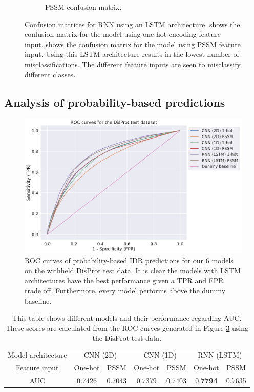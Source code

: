 \documentclass{l4proj}
\begin{document}
\begin{figure}[!htb]
\begin{subfigure}[b]{0.48\textwidth}
        \caption{PSSM confusion matrix.}
        \label{fig:cfrnnpssm}
    \end{subfigure}
    \caption{Confusion matrices for RNN using an LSTM architecture.  shows the confusion matrix for the model using one-hot encoding feature input.  shows the confusion matrix for the model using PSSM feature input. Using this LSTM architecture results in the lowest number of misclassifications. The different feature inputs are seen to misclassify different classes.}
    \label{fig:cfrnn}
\end{figure}

\subsection{Analysis of probability-based predictions}
\label{chap:evaluation sec:testROC}

\begin{figure}[!htb]
    \centering
    \includegraphics[width=0.95\linewidth]{images/DisProtROC.pdf}    

    \caption{ROC curves of probability-based IDR predictions for our 6 models on the withheld DisProt test data. It is clear the models with LSTM architectures have the best performance given a TPR and FPR trade off. Furthermore, every model performs above the dummy baseline.}

    \label{fig:roctest} 
\end{figure}

\begin{table}[!htb]
    \centering
    \caption{This table shows different models and their performance regarding AUC. These scores are calculated from the ROC curves generated in Figure \ref{fig:roctest} using the DisProt test data.}
    \begin{tabular}{@{}ccccccc@{}}
    \toprule
    Model architecture & \multicolumn{2}{c}{CNN (2D)} & \multicolumn{2}{c}{CNN (1D)} & \multicolumn{2}{c}{RNN (LSTM)} \\ \cmidrule{0-0}
    Feature input & One-hot & PSSM & One-hot & PSSM & One-hot & PSSM \\ \midrule
    AUC & 0.7426 & 0.7043 & 0.7379 & 0.7403 & 0.\textbf{7794} & 0.7635 \\ \bottomrule
    \end{tabular}
    
    \label{tab:auctest}
\end{table}
\end{document}
